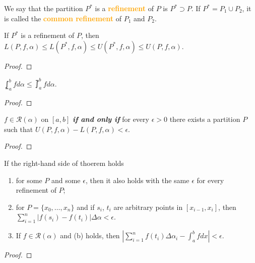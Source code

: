 \begin{definition}
We say that the partition $P^*$ is a \textbf{\textcolor{orange}{refinement}} of $P$ is $P^*\supset P$. If $P^*=P_1\cup P_2$, it is called the \textbf{\textcolor{orange}{common refinement}} of $P_1$ and $P_2$.
\end{definition}

\begin{theorem}
If $P^*$ is a refinement of $P$, then $L(P,f,\alpha)\leq L(P^*,f,\alpha)\leq U(P^*,f,\alpha)\leq U(P,f,\alpha)$.
\end{theorem}
\begin{proof}

\end{proof}

\begin{theorem}
$\displaystyle \lowint_a^bfd\alpha \leq \upint_a^bfd\alpha$.
\end{theorem}
\begin{proof}

\end{proof}

\begin{theorem} \label{thm:integrability_criterion}
$f\in \mathscr{R}(\alpha)$ on $[a,b]$ \textbf{\emph{if and only if}} for every $\epsilon>0$ there exists a partition $P$ such that $U(P,f,\alpha)-L(P,f,\alpha)<\epsilon$.
\end{theorem}
\begin{proof}

\end{proof}

\begin{theorem}
If the right-hand side of thoerem  holds
\begin{enumerate}[label={(\alph*)}]
\item for some $P$ and some $\epsilon$, then it also holds with the same $\epsilon$ for every refinement of $P$;
\item for $P=\{x_0,\dots,x_n\}$ and if $s_i$, $t_i$ are arbitrary points in $[x_{i-1},x_i]$, then $\displaystyle \sum_{i=1}^n|f(s_i)-f(t_i)|\Delta \alpha<\epsilon$.
\item If $f\in \mathscr{R}(\alpha)$ and (b) holds, then $\displaystyle \left|\sum_{i=1}^{n}f(t_i)\Delta \alpha_i - \int_{a}^{b}fdx \right|<\epsilon$.
\end{enumerate}
\end{theorem}
\begin{proof}

\end{proof}

